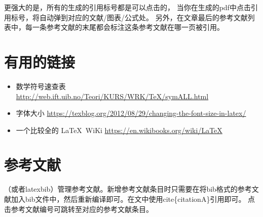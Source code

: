 \documentclass[UTF8]{ctexart}
\numberwithin{equation}{section} %
\numberwithin{table}{section} %
\begin{document}
更强大的是，所有的生成的引用标号都是可以点击的，
当你在生成的pdf中点击引用标号，将自动弹到对应的文献/图表/公式处。
%
另外，在文章最后的参考文献列表中，每一条参考文献的末尾都会标注这条参考文献在哪一页被引用。

%


\section{有用的链接}
\begin{itemize}
  \item 数学符号速查表 \url{http://web.ift.uib.no/Teori/KURS/WRK/TeX/symALL.html}
  \item 字体大小 \url{https://texblog.org/2012/08/29/changing-the-font-size-in-latex/}
  \item 一个比较全的 \LaTeX \ WiKi \url{https://en.wikibooks.org/wiki/LaTeX}
\end{itemize}

\section{参考文献}
（或者latexbib）管理参考文献。新增参考文献条目时只需要在将bib格式的参考文献加入bib文件中，然后重新编译即可。在文中使用cite\{citationA\}引用即可。
点击参考文献编号\cite{shen2017deepskeleton}可跳转至对应的参考文献条目。

\pagebreak



\pagebreak
\end{document}
